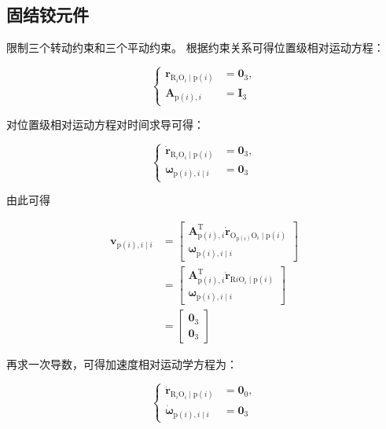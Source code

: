 \subsection{固结铰元件}
限制三个转动约束和三个平动约束。
根据约束关系可得位置级相对运动方程：

\[
\left\{\begin{aligned}
\boldsymbol{r}_{\mathrm{R}_{i} \mathrm{O}_{i} \mid \mathrm{p}(i)} & =\boldsymbol{0}_{3}, \\
\boldsymbol{A}_{\mathrm{p}(i), i} & =\boldsymbol{I}_{3} 
\end{aligned}\right.
\]

对位置级相对运动方程对时间求导可得：

\[
\left\{\begin{aligned}
\dot{\boldsymbol{r}}_{\mathrm{R}_{i} \mathrm{O}_{i} \mid \mathrm{p}(i)} & =\boldsymbol{0}_{3}, \\
\boldsymbol{\omega}_{\mathrm{p}(i), i \mid i} & =\boldsymbol{0}_{3}
\end{aligned}\right.
\]

由此可得

\[
\begin{aligned}
\boldsymbol{v}_{\mathrm{p}(i), i \mid i} & =\left[\begin{array}{c}
\boldsymbol{A}_{\mathrm{p}(i), i}^{\mathrm{T}} \dot{\boldsymbol{r}}_{\mathrm{O}_{\mathrm{p}(i)} \mathrm{O}_{i}\mid \mathrm{p}(i)}   \\
\boldsymbol{\omega}_{\mathrm{p}(i), i \mid i}
\end{array}\right] \\
& =\left[\begin{array}{c}
\boldsymbol{A}_{\mathrm{p}(i), i}^{\mathrm{T}} \dot{\boldsymbol{r}}_{\mathrm{R} i\mathrm{O}_{i} \mid \mathrm{p}(i) } \\
\boldsymbol{\omega}_{\mathrm{p}(i), i \mid i}
\end{array}\right] \\
& =\left[\begin{array}{c}
 \boldsymbol{0}_{3}\\\mathbf{0}_{3}
\end{array}\right]
\end{aligned}
\]

再求一次导数，可得加速度相对运动学方程为：

\[
\left\{\begin{aligned}
\ddot{\boldsymbol{r}}_{\mathrm{R}_{i} \mathrm{O}_{i} \mid \mathrm{p}(i)} & =\boldsymbol{0}_{0}, \\
\dot{\boldsymbol{\omega}}_{\mathrm{p}(i), i\mid i} & =\boldsymbol{0} _{3}
\end{aligned}\right.
\]

